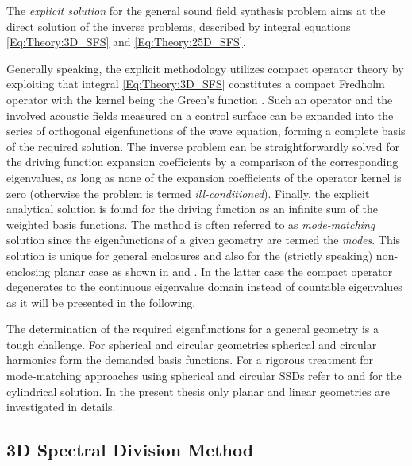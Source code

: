 The \emph{explicit solution} for the general sound field synthesis problem aims at the direct solution of the inverse problems, described by integral equations \eqref{Eq:Theory:3D_SFS} and \eqref{Eq:Theory:25D_SFS}.

Generally speaking, the explicit methodology utilizes compact operator theory by exploiting that integral \eqref{Eq:Theory:3D_SFS} constitutes a compact Fredholm operator with the kernel being the Green's function \cite{MorseFeshbach1953, Ahrens2012}.
Such an operator and the involved acoustic fields measured on a control surface can be expanded into the series of orthogonal eigenfunctions of the wave equation, forming a complete basis of the required solution.
The inverse problem can be straightforwardly solved for the driving function expansion coefficients by a comparison of the corresponding eigenvalues, as long as none of the expansion coefficients of the operator kernel is zero (otherwise the problem is termed \emph{ill-conditioned}).
Finally, the explicit analytical solution is found for the driving function as an infinite sum of the weighted basis functions.
The method is often referred to as \emph{mode-matching} solution since the eigenfunctions of a given geometry are termed the \emph{modes}.
This solution is unique for general enclosures
and also for the (strictly speaking) non-enclosing planar case as shown in \cite{Zotter2013:uniqueness} and \cite{Fazi2010}.
In the latter case the compact operator degenerates to the continuous eigenvalue domain instead of countable eigenvalues as it will be presented in the following.

The determination of the required eigenfunctions for a general geometry is a tough challenge.
For spherical and circular geometries spherical and circular harmonics form the demanded basis functions. 
For a rigorous treatment for mode-matching approaches using spherical and circular SSDs refer to \cite{Ahrens2008:Analytical_Circ_Spherical_SFS, Ahrens2009:circularSSD_mismatch, Ahrens2009:circular25D_SFR, Zotter2009phd, Ahrens2010phd, Ahrens2012, Schultz2014:Comparing_approaches} and \cite{Koyama2014, Koyama2014:phd} for the cylindrical solution.
In the present thesis only planar and linear geometries are investigated in details.

\subsection{3D Spectral Division Method}

